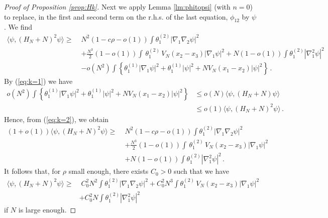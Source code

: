 \documentclass[11pt]{article}
\begin{document}
\begin{proof}[Proof of Proposition \ref{prop:Hk}]
Next we apply Lemma \ref{lm:phitopsi} (with $n=0$)
to replace, in
the first and second term on the r.h.s. of the last equation,
$\phi_{12}$ by $\psi$. We find
\begin{equation}\label{eq:k=2}
\begin{split}
\langle \psi, (H_N+N)^2 \psi \rangle \geq  \;& N^2 (1-c\rho-o(1))
\int \theta_1^{(2)} |\nabla_1 \nabla_2 \psi|^2
\\
&+ \frac{N^3}{2} (1-o(1)) \int \, \theta_1^{(2)} \, V_N (x_2-x_3)
|\nabla_1 \psi|^2+ N (1-o(1)) \int \theta_1^{(2)} |\nabla_1^2 \psi|^2
\\ & - o(N^2) \int \left\{
\theta_1^{(1)} |\nabla_1 \psi|^2 +  \theta_1^{(1)} |\psi|^2
+  NV_N(x_1-x_2)|\psi|^2
\right\} \, .
\end{split}
\end{equation}
By (\ref{eq:k=1}) we have
\begin{equation}
\begin{split}
o(N^2) \int  \left\{  \theta_1^{(1)} |\nabla_1 \psi|^2  +
\theta^{(1)}_1 |\psi|^2  +
 NV_N(x_1-x_2)|\psi|^2 \right\} &\leq o(N) \langle \psi, (H_N+N)\psi
\rangle \\ &\leq o(1) \langle \psi, (H_N+N)^2 \psi \rangle\,.
\end{split}
\end{equation} Hence, from (\ref{eq:k=2}), we obtain
\begin{equation}
\begin{split}
(1+o(1)) \langle \psi, (H_N+N)^2 \psi \rangle \geq \;& N^2
(1-c\rho-o(1))
\int \theta_1^{(2)} |\nabla_1 \nabla_2 \psi|^2 \\
&+ \frac{N^3}{2} (1-o(1)) \int \, \theta_1^{(2)} \, V_N (x_2-x_3)
|\nabla_1 \psi|^2
\\ &+ N (1-o(1)) \int \theta_1^{(2)} |\nabla_1^2 \psi|^2\,.
\end{split}
\end{equation}
It follows that, for $\rho$  small enough, there exists $C_0>0$
such that we have
\begin{equation}
\begin{split}
\langle \psi, (H_N+N)^2 \psi \rangle \geq & \;C_0^2 N^2 \int
\theta_1^{(2)} |\nabla_1 \nabla_2 \psi|^2 + C_0^2 N^3 \int
\theta_1^{(2)} \, V_N (x_2-x_3) |\nabla_1 \psi|^2 \\ &+ C_0^2 N \int
\theta_1^{(2)} |\nabla_1^2 \psi|^2
\end{split}
\end{equation}
if $N$ is large enough.

\medskip


\end{proof}
\end{document}
